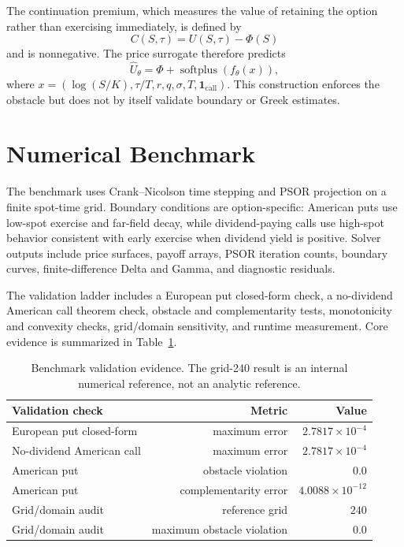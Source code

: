 \documentclass[11pt]{article}
\begin{document}
The continuation premium, which measures the value of retaining the option
rather than exercising immediately, is defined by
\begin{equation}
  C(S,\tau)=U(S,\tau)-\Phi(S)
\end{equation}
and is nonnegative. The price surrogate therefore predicts
\begin{equation}
  \widehat{U}_\theta=\Phi+\operatorname{softplus}(f_\theta(x)),
\end{equation}
where $x=(\log(S/K),\tau/T,r,q,\sigma,T,\mathbf{1}_{\mathrm{call}})$. This construction enforces the obstacle but does not by itself validate boundary or Greek estimates.

\section{Numerical Benchmark}

The benchmark uses Crank--Nicolson time stepping and PSOR projection on a finite spot-time grid. Boundary conditions are option-specific: American puts use low-spot exercise and far-field decay, while dividend-paying calls use high-spot behavior consistent with early exercise when dividend yield is positive. Solver outputs include price surfaces, payoff arrays, PSOR iteration counts, boundary curves, finite-difference Delta and Gamma, and diagnostic residuals.

The validation ladder includes a European put closed-form check, a no-dividend American call theorem check, obstacle and complementarity tests, monotonicity and convexity checks, grid/domain sensitivity, and runtime measurement. Core evidence is summarized in Table~\ref{tab:solver}.

\begin{table}[h]
\centering
\small
\begin{tabular}{lrr}
\toprule
Validation check & Metric & Value \\
\midrule
European put closed-form & maximum error & $2.7817\times10^{-4}$ \\
No-dividend American call & maximum error & $2.7817\times10^{-4}$ \\
American put & obstacle violation & $0.0$ \\
American put & complementarity error & $4.0088\times10^{-12}$ \\
Grid/domain audit & reference grid & $240$ \\
Grid/domain audit & maximum obstacle violation & $0.0$ \\
\bottomrule
\end{tabular}
\caption{Benchmark validation evidence. The grid-240 result is an internal numerical reference, not an analytic reference.}
\label{tab:solver}
\end{table}
\end{document}

